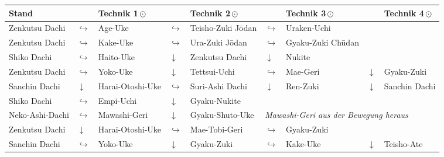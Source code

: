 	\setlength{\tabcolsep}{3pt}
	\null\vfill\null
	\begin{tabularx}{\textwidth}{lllllllll}
		\textbf{Stand} 		& & \textbf{Technik 1\,\(\odot\)} 	&& \textbf{Technik 2\,\(\odot\)} 	&& \textbf{Technik 3\,\(\odot\)}&& \textbf{Technik 4\,\(\odot\)}\\
		\midrule
		Zenkutsu Dachi 		& \(\hookrightarrow\)	& Age-Uke					& \(\hookrightarrow\)	& Teisho-Zuki J\={o}dan	& \(\hookrightarrow\)	& Uraken-Uchi&&	\\
		\midrule
		Zenkutsu Dachi 		& \(\hookrightarrow\)	& Kake-Uke					& \(\hookrightarrow\)	& Ura-Zuki J\={o}dan	& \(\hookrightarrow\)	& Gyaku-Zuki Ch\={u}dan&&	\\
		\midrule
		Shiko Dachi			& \(\hookrightarrow\)	& Haito-Uke					& \(\downarrow\)		& Zenkutsu Dachi 		& \(\downarrow\)		& Nukite&&\\
		\midrule
		Zenkutsu Dachi		& \(\hookrightarrow\)	& Yoko-Uke					& \(\downarrow\)		& Tettsui-Uchi			& \(\hookrightarrow\)	& Mae-Geri &\(\downarrow\) & Gyaku-Zuki\\
		\midrule
		Sanchin Dachi		& \(\downarrow\)		& Harai-Otoshi-Uke			& \(\hookrightarrow\)	& Suri-Ashi Dachi		& \(\downarrow\)		& Ren-Zuki &\(\downarrow\) & Sanchin Dachi\\
		\midrule
		Shiko Dachi			& \(\hookrightarrow\)	& Empi-Uchi					& \(\downarrow\)		& Gyaku-Nukite			&&&&\\
		\midrule
		Neko-Ashi-Dachi		& \(\hookrightarrow\)	& Mawashi-Geri	& \(\downarrow\)		& Gyaku-Shuto-Uke		&\multicolumn{4}{l}{\textit{{\footnotesize Mawashi-Geri aus der Bewegung heraus}}}\\
		\midrule
		Zenkutsu Dachi		& \(\downarrow\)		& Harai-Otoshi-Uke			& \(\hookrightarrow\)	& Mae-Tobi-Geri			& \(\hookrightarrow\)	& Gyaku-Zuki &&\\
		\midrule
		Sanchin Dachi		& \(\hookrightarrow\)	& Yoko-Uke					& \(\downarrow\)		& Gyaku-Zuki			& \(\hookrightarrow\)	& Kake-Uke	& \(\downarrow\)& Teisho-Ate \\					
	\end{tabularx}\\\null\vfill\null
	\setlength{\tabcolsep}{6pt}